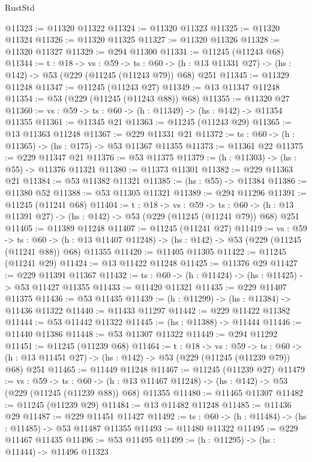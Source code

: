 \begin{lexlean}{RustStd}
\begin{coremodule}
@11323 := @11320 @11322
@11324 := @11320 @11323
@11325 := @11320 @11324
@11326 := @11320 @11325
@11327 := @11320 @11326
@11328 := @11320 @11327
@11329 := @294 @11300
@11331 := @11245 (@11243 @68)
@11344 := {t : @18} ->
  {vs : @59} ->
  {ts : @60} -> (h : @13 @11331 @27) -> (hs : @142) -> @53 (@229 (@11245 (@11243 @79)) @68) @251
@11345 := @11329 @11248
@11347 := @11245 (@11243 @27)
@11349 := @13 @11347 @11248
@11354 := @53 (@229 (@11245 (@11243 @88)) @68)
@11355 := @11320 @27
@11360 := {vs : @59} -> {ts : @60} -> (h : @11349) -> (hs : @142) -> @11354 @11355
@11361 := @11345 @21
@11363 := @11245 (@11243 @29)
@11365 := @13 @11363 @11248
@11367 := @229 @11331 @21
@11372 := {ts : @60} -> (h : @11365) -> (hs : @175) -> @53 @11367 @11355
@11373 := @11361 @22
@11375 := @229 @11347 @21
@11376 := @53 @11375
@11379 := (h : @11303) -> (hs : @55) -> @11376 @11321
@11380 := @11373 @11301
@11382 := @229 @11363 @21
@11384 := @53 @11382 @11321
@11385 := (hs : @55) -> @11384
@11386 := @11380 @52
@11388 := @53 @11305 @11321
@11389 := @294 @11296
@11391 := @11245 (@11241 @68)
@11404 := {t : @18} ->
  {vs : @59} ->
  {ts : @60} -> (h : @13 @11391 @27) -> (hs : @142) -> @53 (@229 (@11245 (@11241 @79)) @68) @251
@11405 := @11389 @11248
@11407 := @11245 (@11241 @27)
@11419 := {vs : @59} ->
  {ts : @60} ->
  (h : @13 @11407 @11248) -> (hs : @142) -> @53 (@229 (@11245 (@11241 @88)) @68) @11355
@11420 := @11405 @11305
@11422 := @11245 (@11241 @29)
@11424 := @13 @11422 @11248
@11425 := @11376 @29
@11427 := @229 @11391 @11367
@11432 := {ts : @60} -> (h : @11424) -> (hs : @11425) -> @53 @11427 @11355
@11433 := @11420 @11321
@11435 := @229 @11407 @11375
@11436 := @53 @11435
@11439 := (h : @11299) -> (hs : @11384) -> @11436 @11322
@11440 := @11433 @11297
@11442 := @229 @11422 @11382
@11444 := @53 @11442 @11322
@11445 := (hs : @11388) -> @11444
@11446 := @11440 @11386
@11448 := @53 @11307 @11322
@11449 := @294 @11292
@11451 := @11245 (@11239 @68)
@11464 := {t : @18} ->
  {vs : @59} ->
  {ts : @60} -> (h : @13 @11451 @27) -> (hs : @142) -> @53 (@229 (@11245 (@11239 @79)) @68) @251
@11465 := @11449 @11248
@11467 := @11245 (@11239 @27)
@11479 := {vs : @59} ->
  {ts : @60} ->
  (h : @13 @11467 @11248) -> (hs : @142) -> @53 (@229 (@11245 (@11239 @88)) @68) @11355
@11480 := @11465 @11307
@11482 := @11245 (@11239 @29)
@11484 := @13 @11482 @11248
@11485 := @11436 @29
@11487 := @229 @11451 @11427
@11492 := {ts : @60} -> (h : @11484) -> (hs : @11485) -> @53 @11487 @11355
@11493 := @11480 @11322
@11495 := @229 @11467 @11435
@11496 := @53 @11495
@11499 := (h : @11295) -> (hs : @11444) -> @11496 @11323

\end{coremodule}
\end{lexlean}

